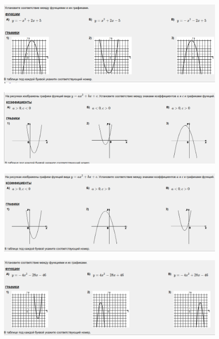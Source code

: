 
\begin{figure}[h!]
	\centering
	\includegraphics[width=1\textwidth]{img/parab_t1.png}
\end{figure}

\begin{figure}[h!]
	\centering
	\includegraphics[width=1\textwidth]{img/parab_t2.png}
\end{figure}

\begin{figure}[h!]
	\centering
	\includegraphics[width=1\textwidth]{img/parab_t3.png}
\end{figure}

\begin{figure}[h!]
	\centering
	\includegraphics[width=1\textwidth]{img/parab_t4.png}
\end{figure}
